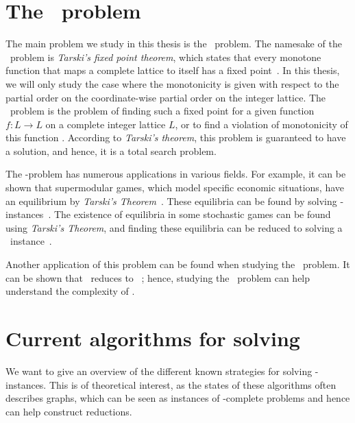 \section{The \Tarski\ problem}

The main problem we study in this thesis is the \Tarski\ problem. The namesake of the \Tarski\ problem is \textit{Tarski's fixed point theorem}, which states that every monotone function that maps a complete lattice to itself has a fixed point~. In this thesis, we will only study the case where the monotonicity is given with respect to the partial order on the coordinate-wise partial order on the integer lattice. The \Tarski\ problem is the problem of finding such a fixed point for a given function $f : L \rightarrow L$ on a complete integer lattice $L$, or to find a violation of monotonicity of this function . According to \textit{Tarski's theorem}, this problem is guaranteed to have a solution, and hence, it is a total search problem.

The \Tarski-problem has numerous applications in various fields. For example, it can be shown that supermodular games, which model specific economic situations, have an equilibrium by \textit{Tarski's Theorem}~. These equilibria can be found by solving \Tarski-instances~\cite{etessami_tarskis_2020}. The existence of equilibria in some stochastic games can be found using \textit{Tarski's Theorem}, and finding these equilibria can be reduced to solving a \Tarski\ instance~.

Another application of this problem can be found when studying the \Arrival\ problem. It can be shown that \Arrival\ reduces to \Tarski\ ; hence, studying the \Tarski\ problem can help understand the complexity of \Arrival.

\section{Current algorithms for solving \Tarski}

We want to give an overview of the different known strategies for solving \Tarski-instances. This is of theoretical interest, as the states of these algorithms often describes graphs, which can be seen as instances of \TFNP-complete problems and hence can help construct reductions.

